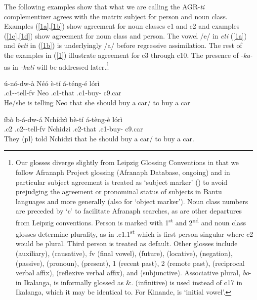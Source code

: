 \documentclass[output=paper,
modfonts
]{langscibook}
\begin{document}
The following examples show that what we are calling the AGR-\textit{ti} complementizer agrees with the matrix subject for person and noun class. Examples (\ref{1a},\ref{1b}) show agreement for noun classes c1 and c2 and examples (\ref{1c},\ref{1d}) show agreement for noun class and person. The vowel /e/ in \textit{eti} (\ref{1a}) and \textit{beti} in (\ref{1b}) is underlyingly /a/ before regressive assimilation. The rest of the examples in (\ref{1}) illustrate agreement for c3 through c10. The presence of -\textit{ka-} as in \textit{-kati} will be addressed later.\footnote{Our glosses diverge slightly from Leipzig Glossing Conventions in that we follow Afranaph Project glossing (Afranaph Database, ongoing) \nocite{AfranaphDatabaseOngoing} and in particular subject agreement is treated as `subject marker' () to avoid prejudging the agreement or pronominal status of subjects in Bantu languages and more generally (also  for `object marker'). Noun class numbers are preceded by ‘c’ to facilitate Afranaph searches, as are other departures from Leipzig conventions. Person is marked with 1\textsuperscript{st} and 2\textsuperscript{nd} and noun class glosses determine plurality, as in .c1.1\textsuperscript{st} which is first person singular where c2 would be plural. Third person is treated as default. Other glosses include  (auxiliary),  (causative), fv (final vowel),  (future),  (locative),  (negation),  (passive),   (pronoun),  (present), 1 (recent past), 2 (remote past),  (reciprocal verbal affix),  (reflexive verbal affix), and  (subjunctive). Associative plural, \textit{bo}- in Ikalanga, is informally glossed as \&.  (infinitive) is used instead of c17 in Ikalanga, which it may be identical to. For Kinande,  is `initial vowel'.}  


\ea \label{1}
\ea \label{1a} \gll ú-nó-dw-à Néó è-tí á-téng-é	lórì\\
.c1--tell-fv Neo .c1-that .c1-buy-	c9.car\\
\glt He/she is telling Neo that she should buy a car/ to buy a car 

\ex \label{1b} \gll íbò b-á-dw-á Nchídzì	bè-tí á-tèng-è lórì \\
.c2	.c2--tell-fv	Nchidzi	.c2-that .c1-buy- c9.car \\
\glt They (pl) told Nchidzi that he should buy a car/ to buy a car.
\end{document}
